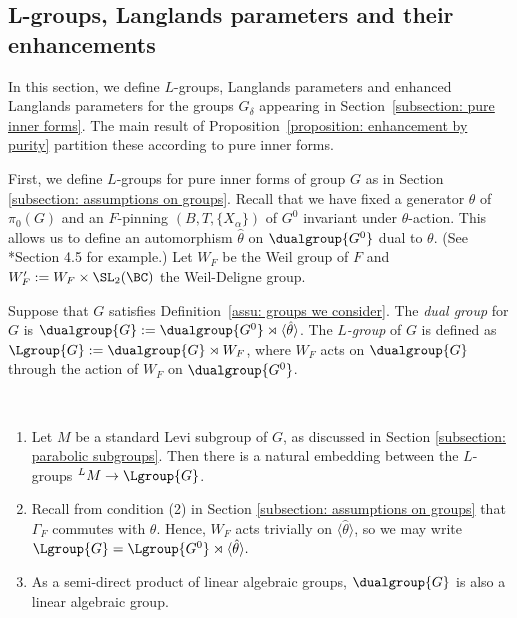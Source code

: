 \documentclass[11pt,letterpaper]{amsart}
\numberwithin{equation}{section}
\begin{document}
\subsection{L-groups, Langlands parameters and their enhancements}
\label{subsection: parameters}

In this section, we define $L$-groups,
Langlands parameters and enhanced Langlands parameters for the groups $G_\delta$ appearing in Section~\ref{subsection: pure inner forms}. The main result of Proposition~\ref{proposition: enhancement by purity} partition these according to pure inner forms. 


First, we define $L$-groups for pure inner forms of group $G$ as in Section \ref{subsection: assumptions on groups}. Recall that we have fixed a generator $\theta$ of $\pi_0(G)$ and an $F$-pinning $(B,T,\{X_{\alpha}\})$ of $G^0$ invariant under $\theta$-action. This allows us to define an automorphism $\hat{\theta}$ on $\dualgroup{G^0}$ dual to $\theta$. (See \cite{Kal26}*{Section 4.5} for example.) Let $W_F$ be the Weil group of $F$ and $W'_F := W_F \times \SL_2(\BC)$ the Weil-Deligne group.

\begin{definition}\label{definition: L-group}
Suppose that $G$ satisfies Definition~\ref{assu: groups we consider}.
    The {\it dual group} for $G$ is $\dualgroup{G} := \dualgroup{G^0}\rtimes\langle{\hat\theta}\rangle$.
    The {\it $L$-group} of $G$ is defined as $\Lgroup{G} := \dualgroup{G}\rtimes W_F$, where $W_F$ acts on $\dualgroup{G}$ through the action of $W_F$ on $\dualgroup{G^0}$.
\end{definition}

\begin{remark}\label{remark: dual group and L group}\ 
    \begin{enumerate}
    \item Let $M$ be a standard Levi subgroup of $G$, as discussed in Section \ref{subsection: parabolic subgroups}. Then there is a natural embedding between the $L$-groups ${}^LM\to \Lgroup{G}$.
        \item Recall from condition (2) in Section \ref{subsection: assumptions on groups} that $\Gamma_F$ commutes with $\theta$. Hence, $W_F$ acts trivially on $\langle{\hat\theta}\rangle$, so we may write 
$
\Lgroup{G}  = \Lgroup{G^0}\rtimes\langle{\hat\theta}\rangle.
$
\item As a semi-direct product of linear algebraic groups, $\dualgroup{G}$ is also a linear algebraic group.
    \end{enumerate}
\end{remark}
\end{document}
